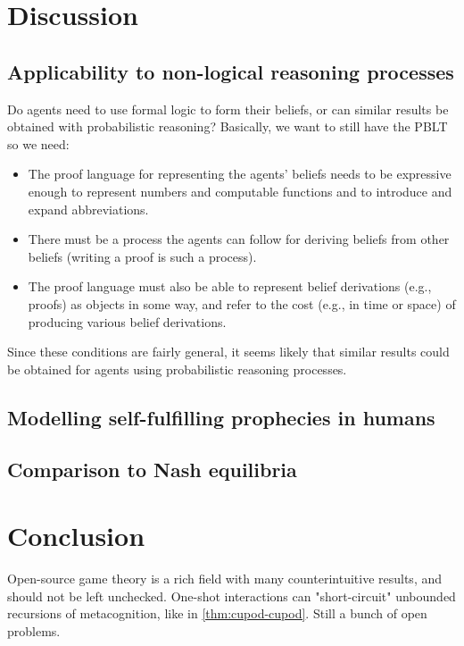 \documentclass{article}
\begin{document}
\section{Discussion}
\subsection{Applicability to non-logical reasoning processes}
Do agents need to use formal logic to form their beliefs, or can similar results be obtained with probabilistic reasoning?
Basically, we want to still have the PBLT so we need: \begin{itemize}
    \item  The proof language for representing the agents’ beliefs needs to be
expressive enough to represent numbers and computable functions and
to introduce and expand abbreviations.
    \item There must be a process the agents can follow for deriving beliefs from
other beliefs (writing a proof is such a process).
    \item The proof language must also be able to represent belief derivations
(e.g., proofs) as objects in some way, and refer to the cost (e.g., in time
or space) of producing various belief derivations.
\end{itemize}
Since these conditions are fairly general, it seems likely that similar results could be obtained for agents using probabilistic reasoning processes.
\subsection{Modelling self-fulfilling prophecies in humans}
\subsection{Comparison to Nash equilibria}

\section{Conclusion}
Open-source game theory is a rich field with many counterintuitive results, and should not be left unchecked.
One-shot interactions can "short-circuit" unbounded recursions of metacognition, like in \cref{thm:cupod-cupod}.
Still a bunch of open problems.



\printbibliography
\end{document}
